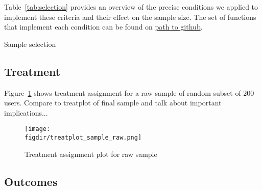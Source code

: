 Table~\ref{tab:selection} provides an overview of the precise conditions we applied to implement
these criteria and their effect on the sample size. The set of functions that
implement each condition can be found on \href{path-to-github}{path to github}.

\begin{table}
\centering
\caption{Sample selection}\label{tab:selection}

\end{table}


\subsection{Treatment}%
\label{sub:treatment}

Figure~\ref{fig:treatplot_sample_raw} shows treatment assignment for a raw
sample of random subset of 200 users. Compare to treatplot of final sample and
talk about important implications...

\begin{figure}[htpb]
    \centering
    \caption{Treatment assignment plot for raw sample}%
    \texttt{[image: \\figdir/treatplot\_sample\_raw.png]}
    \label{fig:treatplot_sample_raw}
\end{figure}


\subsection{Outcomes}%
\label{sub:outcomes}

